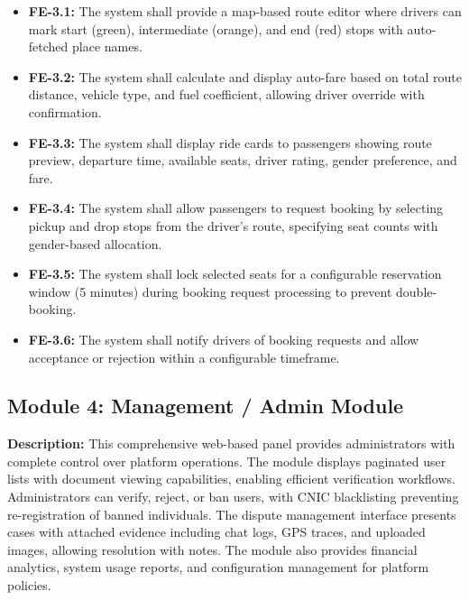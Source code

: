 \begin{itemize}
    \item \textbf{FE-3.1:} The system shall provide a map-based route editor where drivers can mark start (green), intermediate (orange), and end (red) stops with auto-fetched place names.
    
    \item \textbf{FE-3.2:} The system shall calculate and display auto-fare based on total route distance, vehicle type, and fuel coefficient, allowing driver override with confirmation.
    
    \item \textbf{FE-3.3:} The system shall display ride cards to passengers showing route preview, departure time, available seats, driver rating, gender preference, and fare.
    
    \item \textbf{FE-3.4:} The system shall allow passengers to request booking by selecting pickup and drop stops from the driver's route, specifying seat counts with gender-based allocation.
    
    \item \textbf{FE-3.5:} The system shall lock selected seats for a configurable reservation window (5 minutes) during booking request processing to prevent double-booking.
    
    \item \textbf{FE-3.6:} The system shall notify drivers of booking requests and allow acceptance or rejection within a configurable timeframe.
\end{itemize}

\subsection{Module 4: Management / Admin Module}

\textbf{Description:} This comprehensive web-based panel provides administrators with complete control over platform operations. The module displays paginated user lists with document viewing capabilities, enabling efficient verification workflows. Administrators can verify, reject, or ban users, with CNIC blacklisting preventing re-registration of banned individuals. The dispute management interface presents cases with attached evidence including chat logs, GPS traces, and uploaded images, allowing resolution with notes. The module also provides financial analytics, system usage reports, and configuration management for platform policies.

